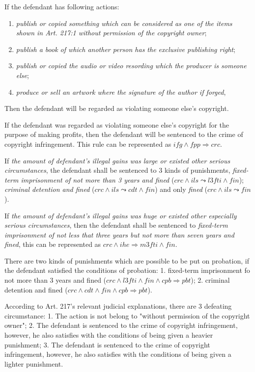 \documentclass{IOS-Book-Article}
\begin{document}
If the defendant has following actions:
\begin{enumerate}
\item \textit{publish or copied something which can be considered as one of the items shown in Art. 217:1 without permission of the copyright owner};
\item \textit{publish a book of which another person has the exclusive publishing right};
\item  \textit{publish or copied the audio or video resording which the producer is someone else};
\item \textit{produce or sell an artwork where the signature of the author if forged},
\end{enumerate}
Then the defendant will be regarded as violating someone else's copyright.

If the defendant was regarded as violating someone else's copyright for the purpose of making profits, then the defendant will be sentenced to the crime of copyright infringement. This rule can be represented as $ifg \wedge fpp \Rightarrow crc$.

If \textit{the amount of defendant's illegal gains was large or existed other serious circumstances}, the defendant shall be sentenced to 3 kinds of punishments, \textit{fixed-term imprisonment of not more than 3 years and fined} ($crc \wedge ils \leadsto l3fti \wedge fin$); \textit{criminal detention and fined} ($crc \wedge ils \leadsto cdt \wedge fin$) and only \textit{fined} ($crc \wedge ils \leadsto fin$).

If \textit{the amount of defendant's illegal gains was huge or existed other especially serious circumstances}, then the defendant shall be sentenced to \textit{fixed-term imprisonment of not less that three years but not more than seven years and fined}, this can be represented as $crc \wedge ihe \Rightarrow m3fti \wedge fin$.

There are two kinds of punishments which are possible to be put on probation, if the defendant satisfied the conditions of probation: 
1. fixed-term imprisonment fo not more than 3 years and fined ($crc \wedge l3fti \wedge fin \wedge cpb \Rightarrow pbt$); 2. criminal detention and fined ($crc \wedge cdt \wedge fin \wedge cpb \Rightarrow pbt$).

According to Art. 217's relevant judicial explanations, there are 3 defeating circumstance: 1. The action is not belong to "without permission of the copyright owner"; 2. The defendant is sentenced to the crime of copyright infringement, however, he also satisfies with the conditions of being given a heavier punishment; 3. The defendant is sentenced to the crime of copyright infringement, however, he also satisfies with the conditions of being given a lighter punishment.
\end{document}
